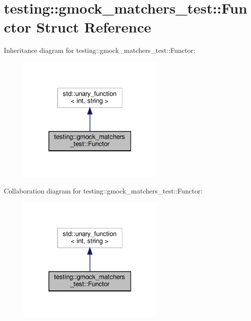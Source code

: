 \hypertarget{structtesting_1_1gmock__matchers__test_1_1_functor}{}\section{testing\+:\+:gmock\+\_\+matchers\+\_\+test\+:\+:Functor Struct Reference}
\label{structtesting_1_1gmock__matchers__test_1_1_functor}


Inheritance diagram for testing\+:\+:gmock\+\_\+matchers\+\_\+test\+:\+:Functor\+:
\nopagebreak
\begin{figure}[H]
\begin{center}
\leavevmode
\includegraphics[width=207pt]{structtesting_1_1gmock__matchers__test_1_1_functor__inherit__graph}
\end{center}
\end{figure}


Collaboration diagram for testing\+:\+:gmock\+\_\+matchers\+\_\+test\+:\+:Functor\+:
\nopagebreak
\begin{figure}[H]
\begin{center}
\leavevmode
\includegraphics[width=207pt]{structtesting_1_1gmock__matchers__test_1_1_functor__coll__graph}
\end{center}
\end{figure}
